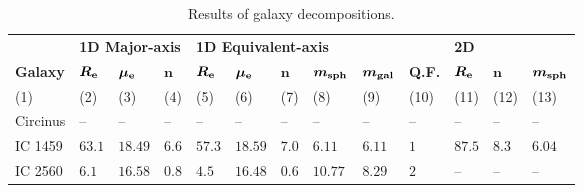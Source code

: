 \begin{table*}                                        
\begin{center}                                        
\caption{Results of galaxy decompositions.}                        
\begin{tabular}{lllllllllllll}                           
\hline                                                
 & 
\multicolumn{3}{l}{{\bf 1D Major-axis}} &                   
\multicolumn{5}{l}{{\bf 1D Equivalent-axis }} &                   
 & 
\multicolumn{3}{l}{{\bf 2D }} \\                    
\multicolumn{1}{l}{{\bf Galaxy }} &                   
\multicolumn{1}{l}{{\bf $\bm{R_{\rm e}}$ }} &                 
\multicolumn{1}{l}{{\bf $\bm{\mu_{\rm e}}$ }} &  
\multicolumn{1}{l}{{\bf $\bm{n}$ }} &			  
\multicolumn{1}{l}{{\bf $\bm{R_{\rm e}}$ }} &			  
\multicolumn{1}{l}{{\bf $\bm{\mu_{\rm e}}$ }} &			  
\multicolumn{1}{l}{{\bf $\bm{n}$ }} &			  
\multicolumn{1}{l}{{\bf $\bm{m_{\rm sph}}$ }} &			  
\multicolumn{1}{l}{{\bf $\bm{m_{\rm gal}}$ }} &			  
\multicolumn{1}{l}{{\bf Q.F. }} &			  
\multicolumn{1}{l}{{\bf $\bm{R_{\rm e}}$ }} &			  
\multicolumn{1}{l}{{\bf $\bm{n}$ }} &                   
\multicolumn{1}{l}{{\bf $\bm{m_{\rm sph}}$ }} \\                
\multicolumn{1}{l}{(1)} &                             
\multicolumn{1}{l}{(2)} &                             
\multicolumn{1}{l}{(3)} &                             
\multicolumn{1}{l}{(4)} &                             
\multicolumn{1}{l}{(5)} &                             
\multicolumn{1}{l}{(6)} &                             
\multicolumn{1}{l}{(7)} &                             
\multicolumn{1}{l}{(8)} &                             
\multicolumn{1}{l}{(9)} &                             
\multicolumn{1}{l}{(10)} &                             
\multicolumn{1}{l}{(11)} &                             
\multicolumn{1}{l}{(12)} &                             
\multicolumn{1}{l}{(13)} \\                         
\hline                                                
Circinus   \quad &   -- &   -- &   -- \quad \quad &   -- &   -- &   -- &   -- &   -- \quad \quad & 
 -- \quad \quad & 
 -- &   -- &   --    \\ 
IC 1459  \quad &  $63.1$  &  $18.49$  &  $6.6$  \quad \quad &  $57.3$  &  $18.59$  &  $7.0$  &  $6.11$  &  $6.11$  \quad \quad &  $1$  \quad \quad &  $87.5$  &  $8.3$  &  $6.04$  \\ 
IC 2560  \quad &  $6.1$  &  $16.58$  &  $0.8$  \quad \quad &  $4.5$  &  $16.48$  &  $0.6$  &  $10.77$  &  $8.29$  \quad \quad &  $2$  \quad \quad &   -- &   -- &   --    \\ 

\end{tabular}
\end{center}
\end{table*}
